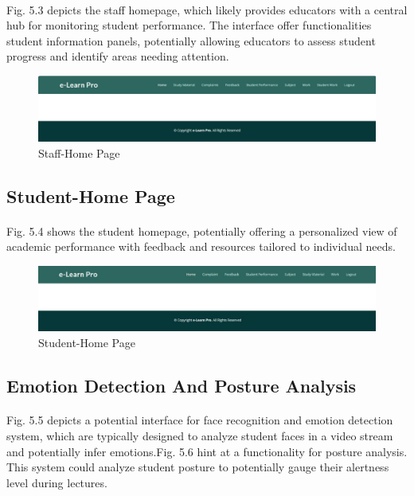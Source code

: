 \paragraph{} Fig. 5.3 depicts the staff homepage, which likely provides educators with a central hub for monitoring student performance. The interface offer functionalities student information panels, potentially allowing educators to assess student progress and identify areas needing attention.
\begin{figure}[!ht]
\centering
\includegraphics[width=125mm]{staff homepage.png}
\caption{Staff-Home Page}
\end{figure} 

\subsection{Student-Home Page}
\paragraph{} Fig. 5.4 shows the student homepage, potentially offering a personalized view of academic performance with feedback and resources tailored to individual needs.
\begin{figure}[!ht]
\centering
\includegraphics[width=125mm]{student homepage.png}
\caption{Student-Home Page}
\end{figure} 

\subsection{Emotion Detection And Posture Analysis}
\paragraph{} Fig. 5.5 depicts a potential interface for face recognition and emotion detection system, which are typically designed to analyze student faces in a video stream and potentially infer emotions.Fig. 5.6 hint at a functionality for posture analysis. This system could analyze student posture to potentially gauge their alertness level during lectures.

